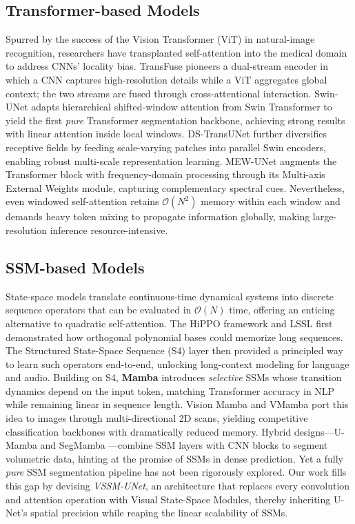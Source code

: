 \documentclass[conference]{IEEEtran}
\begin{document}
\subsection{Transformer-based Models}
Spurred by the success of the Vision Transformer (ViT) in natural-image recognition, researchers have transplanted self-attention into the medical domain to address CNNs’ locality bias.  TransFuse \cite{11} pioneers a dual-stream encoder in which a CNN captures high-resolution details while a ViT aggregates global context; the two streams are fused through cross-attentional interaction.  Swin-UNet \cite{cao2021} adapts hierarchical shifted-window attention from Swin Transformer \cite{13} to yield the first \emph{pure} Transformer segmentation backbone, achieving strong results with linear attention inside local windows.  DS-TransUNet \cite{30} further diversifies receptive fields by feeding scale-varying patches into parallel Swin encoders, enabling robust multi-scale representation learning.  MEW-UNet \cite{6} augments the Transformer block with frequency-domain processing through its Multi-axis External Weights module, capturing complementary spectral cues.  Nevertheless, even windowed self-attention retains \(\mathcal{O}(N^{2})\) memory within each window and demands heavy token mixing to propagate information globally, making large-resolution inference resource-intensive.

\subsection{SSM-based Models}
State-space models translate continuous-time dynamical systems into discrete sequence operators that can be evaluated in \(\mathcal{O}(N)\) time, offering an enticing alternative to quadratic self-attention.  The HiPPO framework \cite{31} and LSSL \cite{32} first demonstrated how orthogonal polynomial bases could memorize long sequences.  The Structured State-Space Sequence (S4) layer \cite{19} then provided a principled way to learn such operators end-to-end, unlocking long-context modeling for language and audio.  Building on S4, \textbf{Mamba} \cite{gu2023} introduces \emph{selective} SSMs whose transition dynamics depend on the input token, matching Transformer accuracy in NLP while remaining linear in sequence length.  Vision Mamba and VMamba \cite{liu2024} port this idea to images through multi-directional 2D scans, yielding competitive classification backbones with dramatically reduced memory.  Hybrid designs—U-Mamba \cite{22} and SegMamba \cite{23}—combine SSM layers with CNN blocks to segment volumetric data, hinting at the promise of SSMs in dense prediction.  Yet a fully \emph{pure} SSM segmentation pipeline has not been rigorously explored.  Our work fills this gap by devising \emph{VSSM-UNet}, an architecture that replaces every convolution and attention operation with Visual State-Space Modules, thereby inheriting U-Net’s spatial precision while reaping the linear scalability of SSMs.
\end{document}
